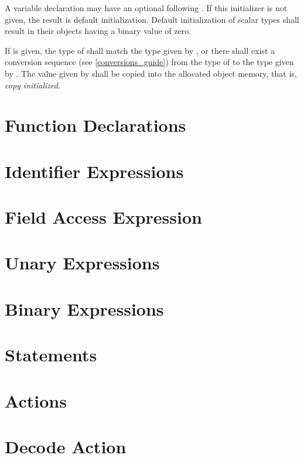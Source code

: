 A variable declaration may have an optional  following .  If this initializer is not given, the result is default initialization. Default initialization of scalar types shall result in their objects having a binary value of zero.

If  is given, the type of  shall match the type given by , or there shall exist a conversion sequence (see \ref{conversions_guide}) from the type of  to the type given by . The value given by  shall be copied into the allocated object memory, that is, \textit{copy initialized}.

\section{Function Declarations} \label{function_guide}

\section{Identifier Expressions} \label{id_expr_guide}

\section{Field Access Expression} \label{field_access_expr_guide}

\section{Unary Expressions} \label{unary_expr_guide}

\section{Binary Expressions} \label{binary_expr_guide}

\section{Statements} \label{statements_guide}

\section{Actions} \label{action_guide}

\section{Decode Action} \label{decode_guide}

